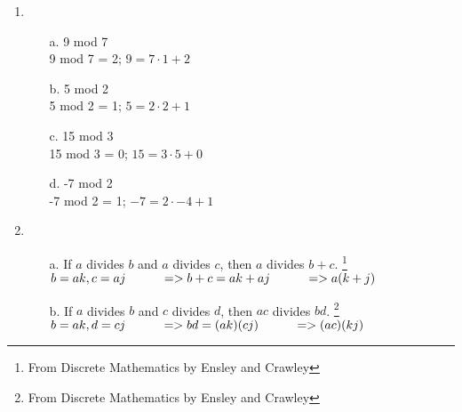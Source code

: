 
\newcommand{\laClass}       {CS 210}
\newcommand{\laSemester}    {Spring 2018}
\newcommand{\laChapter}     {2.2}
\newcommand{\laType}        {Exercise}
\newcommand{\laPoints}      {5}
\newcommand{\laTitle}       {Proofs About Numbers}
\newcommand{\laDate}        {}
\setcounter{chapter}{2}
\setcounter{section}{2}
\addtocounter{section}{-1}

\toggletrue{answerkey}






    \begin{enumerate}
        \item   
            \begin{enumerate}
                \item[a.] 9 mod 7 \\ 
                    9 mod 7 = 2; \tab $9 = 7 \cdot 1 + 2$

                \item[b.] 5 mod 2 \\ 
                    5 mod 2 = 1; \tab $5 = 2 \cdot 2 + 1$

                \item[c.] 15 mod 3 \\ 
                    15 mod 3 = 0; \tab $15 = 3 \cdot 5 + 0$

                \item[d.] -7 mod 2 \\ 
                    -7 mod 2 = 1; \tab $-7 = 2 \cdot -4 + 1$
            \end{enumerate}

        \item
            \begin{enumerate}
                \item[a.] If $a$ divides $b$ and $a$ divides $c$, then $a$ divides $b + c$.
                    \footnote{From Discrete Mathematics by Ensley and Crawley} \\
                        $b = ak, c = aj \hspace*{1cm} => b + c = ak + aj \hspace*{1cm} => a(k+j) $

                \item[b.] If $a$ divides $b$ and $c$ divides $d$, then $ac$ divides $bd$.
                    \footnote{From Discrete Mathematics by Ensley and Crawley} \\
                    $b = ak, d = cj \hspace*{1cm} => bd = (ak)(cj) \hspace*{1cm} => (ac)(kj) $
            \end{enumerate}
    \end{enumerate}





